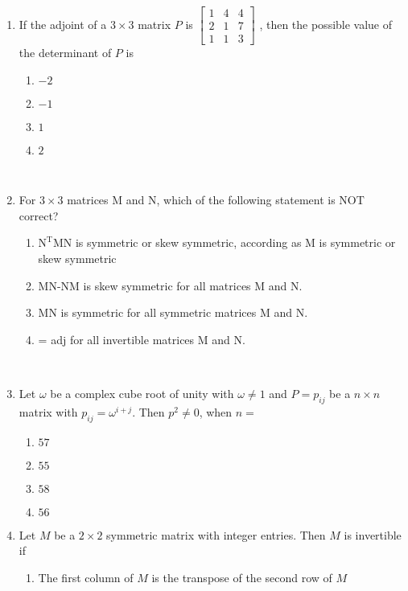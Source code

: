 \documentclass[journal,12pt,twocolumn]{IEEEtran}
\theoremstyle{remark}
\begin{document}
\begin{enumerate}
\begin{enumerate}
				\item 
					If the adjoint of a $3 \times 3$ matrix $P$ is 
							$\begin{bmatrix}
								1&4&4\\
								2&1&7\\
								1&1&3
							\end{bmatrix}$
					, then the possible value of the determinant of $P$ is 
						\begin{enumerate}
							\item $-2$
							\item $-1$
							\item $1$
							\item $2$
						\end{enumerate}
						\hfill {}\\
				\item 
					For $3 \times 3$ matrices M and N, which of the following statement is  NOT correct?
						\begin{enumerate}
							\item $\mathrm{N^TMN}$ is symmetric or skew symmetric, according as M is symmetric or skew symmetric
							\item MN-NM is skew symmetric for all matrices M and N.
							\item MN is symmetric for all symmetric matrices M and N.
							\item {} = adj for all invertible matrices M and N.
						\end{enumerate}
						\hfill {}\\
				\item 
					Let $\omega$ be a complex cube root of unity with $\omega \neq 1 $ and $P={p_{ij}}$ be a $n \times n$ matrix with $p_{ij} = \omega^{i+j}$. Then $p^2 \neq 0$, when $n=$
					\begin{enumerate}
						\item $57$
						\item $55 $
						\item $58$
						\item $56$
					\end{enumerate}
					\hfill {}
				\item 
					Let $M$ be a $2 \times 2$ symmetric matrix with integer entries. Then $M$ is invertible if
						\begin{enumerate}
							\item The first column of $M$ is the transpose of the second row of $M$

\end{enumerate}
\end{enumerate}
\end{enumerate}
\end{document}
